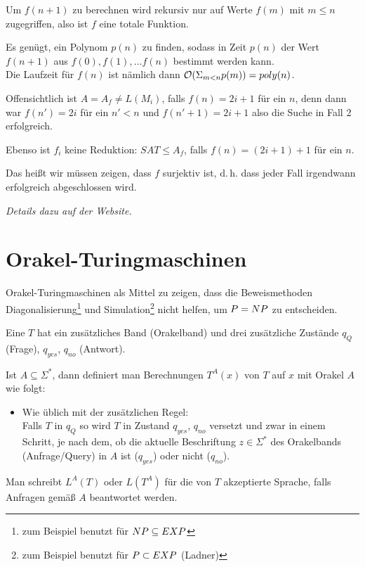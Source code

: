 Um $f(n+1)$ zu berechnen wird rekursiv nur auf Werte $f(m)$ mit $m \leq n$ zugegriffen, also ist $f$ eine totale Funktion.

Es genügt, ein Polynom $p(n)$ zu finden, sodass in Zeit $p(n)$ der Wert $f(n+1)$ aus $f(0), f(1), \dots f(n)$ bestimmt werden kann.\\
Die Laufzeit für $f(n)$ ist nämlich dann $\mathcal{O}(\Sigma_{m < n} p(m)) = poly(n)$.


Offensichtlich ist $A = A_f \neq L(M_i)$, falls $f(n) = 2i+1$ für ein $n$, denn dann war $f(n') = 2i$ für ein $n' < n$ und $f(n'+1) = 2i+1$ also die Suche in Fall 2 erfolgreich.

Ebenso ist $f_i$ keine Reduktion: $SAT \leq A_f$, falls $f(n) = (2i+1)+1$ für ein $n$.

Das heißt wir müssen zeigen, dass $f$ surjektiv ist, d.\,h. dass jeder Fall irgendwann erfolgreich abgeschlossen wird.


\textit{Details dazu auf der Website.}












\section{Orakel-Turingmaschinen}


Orakel-Turingmaschinen als Mittel zu zeigen, dass die Beweismethoden Diagonalisierung\footnote{zum Beispiel benutzt für $NP \subseteq EXP$} und Simulation\footnote{zum Beispiel benutzt für $P \subset EXP$ (Ladner)} nicht helfen, um $P = NP$ zu entscheiden.



\begin{definition}
    
    Eine  $T$ hat ein zusätzliches Band (Orakelband) und drei zusätzliche Zustände $q_Q$ (Frage), $q_{yes}$, $q_{no}$ (Antwort).

    Ist $A \subseteq \Sigma^\ast$, dann definiert man Berechnungen $T^A(x)$ von $T$ auf $x$ mit Orakel $A$ wie folgt:
    \begin{itemize}
        \item Wie üblich mit der zusätzlichen Regel:\\
            Falls $T$ in $q_Q$ so wird $T$ in Zustand $q_{yes}$, $q_{no}$ versetzt und zwar in einem Schritt, je nach dem, ob die aktuelle Beschriftung $z \in \Sigma^\ast$ des Orakelbands (Anfrage/Query) in $A$ ist ($q_{yes}$) oder nicht ($q_{no}$).
    \end{itemize}
    Man schreibt $L^A(T)$ oder $L(T^A)$ für die von $T$ akzeptierte Sprache, falls Anfragen gemäß $A$ beantwortet werden.

\end{definition}




